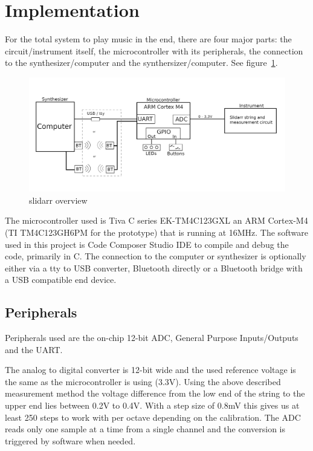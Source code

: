 \documentclass{article}
\begin{document}
\section{Implementation}

For the total system to play music in the end, there are four major parts: the circuit/instrument itself, the microcontroller with its peripherals, the connection to the synthesizer/computer and the synthersizer/computer. See figure~\ref{fig:slidarr overview}.

\begin{figure}[ht]
  \centering
  \includegraphics[width=1\textwidth]{BasicSystemOverview.png}
  \caption{slidarr overview}
  \label{fig:slidarr overview}
\end{figure}

The microcontroller used is Tiva C series EK-TM4C123GXL an ARM Cortex-M4 (TI TM4C123GH6PM for the prototype) that is running at 16MHz. The software used in this project is Code Composer Studio IDE to compile and debug the code, primarily in C. The connection to the computer or synthesizer is optionally either via a tty to USB converter, Bluetooth directly or a Bluetooth bridge with a USB compatible end device.

\subsection{Peripherals}
Peripherals used are the on-chip 12-bit ADC, General Purpose Inputs/Outputs and the UART.

The analog to digital converter is 12-bit wide and the used reference voltage is the same as the microcontroller is using (3.3V). Using the above described measurement method the voltage difference from the low end of the string to the upper end lies between 0.2V to 0.4V. With a step size of 0.8mV this gives us at least 250 steps to work with per octave depending on the calibration. The ADC reads only one sample at a time from a single channel and the conversion is triggered by software when needed.
\end{document}

